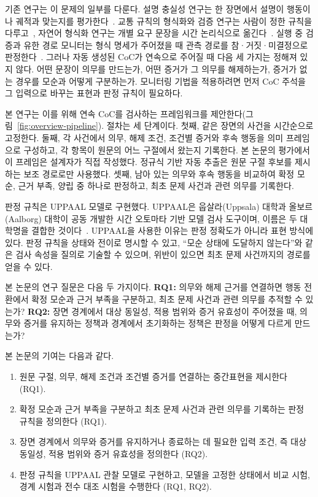 \begin{revision}
기존 연구는 이 문제의 일부를 다룬다. 설명 충실성 연구는 한 장면에서 설명이 행동이나 궤적과 맞는지를 평가한다~\cite{mayumu2026faithfulness,nguyen2026vladrivebench,yu2026drivethoughts}. 교통 규칙의 형식화와 검증 연구는 사람이 정한 규칙을 다루고~\cite{esterle2020,maierhofer2020,wan2024}, 자연어 형식화 연구는 개별 요구 문장을 시간 논리식으로 옮긴다~\cite{chen2023nl2tl,cosler2023nl2spec}. 실행 중 검증과 유한 경로 모니터는 형식 명세가 주어졌을 때 관측 경로를 참·거짓·미결정으로 판정한다~\cite{leucker2009runtime,bauer2011runtime}. 그러나 자동 생성된 CoC가 연속으로 주어질 때 다음 세 가지는 정해져 있지 않다. 어떤 문장이 의무를 만드는가, 어떤 증거가 그 의무를 해제하는가, 증거가 없는 경우를 모순과 어떻게 구분하는가. 모니터링 기법을 적용하려면 먼저 CoC 주석을 그 입력으로 바꾸는 표현과 판정 규칙이 필요하다.

본 연구는 이를 위해 연속 CoC를 검사하는 프레임워크를 제안한다(그림~\ref{fig:overview-pipeline}). 절차는 세 단계이다. 첫째, 같은 장면의 사건을 시간순으로 고정한다. 둘째, 각 사건에서 의무, 해제 조건, 조건별 증거와 후속 행동을 의미 프레임으로 구성하고, 각 항목이 원문의 어느 구절에서 왔는지 기록한다. 본 논문의 평가에서 이 프레임은 설계자가 직접 작성했다. 정규식 기반 자동 추출은 원문 구절 후보를 제시하는 보조 경로로만 사용했다. 셋째, 남아 있는 의무와 후속 행동을 비교하여 확정 모순, 근거 부족, 양립 중 하나로 판정하고, 최초 문제 사건과 관련 의무를 기록한다.

판정 규칙은 UPPAAL 모델로 구현했다. UPPAAL은 웁살라(Uppsala) 대학과 올보르(Aalborg) 대학이 공동 개발한 시간 오토마타 기반 모델 검사 도구이며, 이름은 두 대학명을 결합한 것이다~\cite{uppaalofficial,uppaalname,behrmann2004uppaal}. UPPAAL을 사용한 이유는 판정 정확도가 아니라 표현 방식에 있다. 판정 규칙을 상태와 전이로 명시할 수 있고, ``모순 상태에 도달하지 않는다''와 같은 검사 속성을 질의로 기술할 수 있으며, 위반이 있으면 최초 문제 사건까지의 경로를 얻을 수 있다.

본 논문의 연구 질문은 다음 두 가지이다. \textbf{RQ1:} 의무와 해제 근거를 연결하면 행동 전환에서 확정 모순과 근거 부족을 구분하고, 최초 문제 사건과 관련 의무를 추적할 수 있는가? \textbf{RQ2:} 장면 경계에서 대상 동일성, 적용 범위와 증거 유효성이 주어졌을 때, 의무와 증거를 유지하는 정책과 경계에서 초기화하는 정책은 판정을 어떻게 다르게 만드는가?

본 논문의 기여는 다음과 같다.
\begin{enumerate}
\item
원문 구절, 의무, 해제 조건과 조건별 증거를 연결하는 중간표현을 제시한다 (RQ1).
\item
확정 모순과 근거 부족을 구분하고 최초 문제 사건과 관련 의무를 기록하는 판정 규칙을 정의한다 (RQ1).
\item
장면 경계에서 의무와 증거를 유지하거나 종료하는 데 필요한 입력 조건, 즉 대상 동일성, 적용 범위와 증거 유효성을 정의한다 (RQ2).
\item
판정 규칙을 UPPAAL 관찰 모델로 구현하고, 모델을 고정한 상태에서 비교 시험, 경계 시험과 전수 대조 시험을 수행한다 (RQ1, RQ2).
\end{enumerate}


\end{revision}
